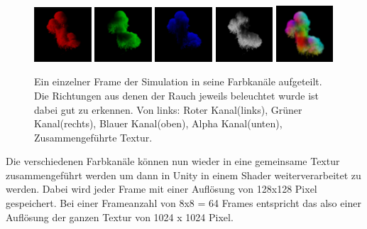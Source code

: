 \begin{figure}[h!]
	\centering
	\includegraphics[width=0.19\textwidth]{Grafiken/Implementation/Lightmaps/T1_R.png}
	\includegraphics[width=0.19\textwidth]{Grafiken/Implementation/Lightmaps/T1_G.png}
	\includegraphics[width=0.19\textwidth]{Grafiken/Implementation/Lightmaps/T1_B.png}
	\includegraphics[width=0.19\textwidth]{Grafiken/Implementation/Lightmaps/T1_A.png}
	\includegraphics[width=0.19\textwidth]{Grafiken/Implementation/Lightmaps/merged.png}

	\begin{footnotesize}
		\caption{Ein einzelner Frame der Simulation in seine Farbkanäle aufgeteilt. Die Richtungen aus denen der Rauch jeweils beleuchtet wurde ist dabei gut zu erkennen.
			Von links: Roter Kanal(links), Grüner Kanal(rechts), Blauer Kanal(oben), Alpha Kanal(unten), Zusammengeführte Textur.}
		\label{fig:lightDirections}
	\end{footnotesize}
\end{figure}


Die verschiedenen Farbkanäle können nun wieder in eine gemeinsame Textur zusammengeführt werden um dann in Unity in einem Shader weiterverarbeitet zu werden.
Dabei wird jeder Frame mit einer Auflösung von 128x128 Pixel gespeichert. Bei einer Frameanzahl von 8x8 = 64 Frames entspricht das also
einer Auflösung der ganzen Textur von 1024 x 1024 Pixel.

